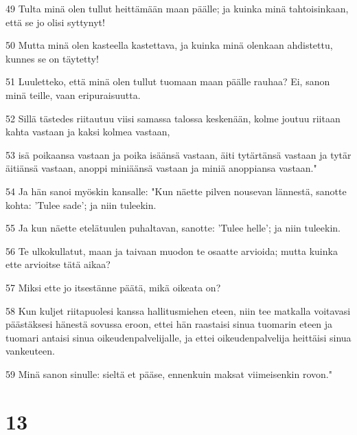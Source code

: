 \par 49 Tulta minä olen tullut heittämään maan päälle; ja kuinka minä tahtoisinkaan, että se jo olisi syttynyt!
\par 50 Mutta minä olen kasteella kastettava, ja kuinka minä olenkaan ahdistettu, kunnes se on täytetty!
\par 51 Luuletteko, että minä olen tullut tuomaan maan päälle rauhaa? Ei, sanon minä teille, vaan eripuraisuutta.
\par 52 Sillä tästedes riitautuu viisi samassa talossa keskenään, kolme joutuu riitaan kahta vastaan ja kaksi kolmea vastaan,
\par 53 isä poikaansa vastaan ja poika isäänsä vastaan, äiti tytärtänsä vastaan ja tytär äitiänsä vastaan, anoppi miniäänsä vastaan ja miniä anoppiansa vastaan."
\par 54 Ja hän sanoi myöskin kansalle: "Kun näette pilven nousevan lännestä, sanotte kohta: 'Tulee sade'; ja niin tuleekin.
\par 55 Ja kun näette etelätuulen puhaltavan, sanotte: 'Tulee helle'; ja niin tuleekin.
\par 56 Te ulkokullatut, maan ja taivaan muodon te osaatte arvioida; mutta kuinka ette arvioitse tätä aikaa?
\par 57 Miksi ette jo itsestänne päätä, mikä oikeata on?
\par 58 Kun kuljet riitapuolesi kanssa hallitusmiehen eteen, niin tee matkalla voitavasi päästäksesi hänestä sovussa eroon, ettei hän raastaisi sinua tuomarin eteen ja tuomari antaisi sinua oikeudenpalvelijalle, ja ettei oikeudenpalvelija heittäisi sinua vankeuteen.
\par 59 Minä sanon sinulle: sieltä et pääse, ennenkuin maksat viimeisenkin rovon."

\chapter{13}

